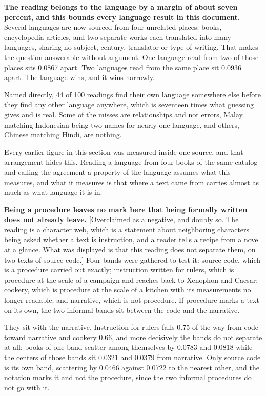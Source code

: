 \textbf{The reading belongs to the language by a margin of about seven percent, and this bounds every language result in this document.} Several languages are now sourced from four unrelated places: books, encyclopedia articles, and two separate works each translated into many languages, sharing no subject, century, translator or type of writing. That makes the question answerable without argument. One language read from two of those places sits 0.0867 apart. Two languages read from the same place sit 0.0936 apart. The language wins, and it wins narrowly.

Named directly, 44 of 100 readings find their own language somewhere else before they find any other language anywhere, which is seventeen times what guessing gives and is real. Some of the misses are relationships and not errors, Malay matching Indonesian being two names for nearly one language, and others, Chinese matching Hindi, are nothing.

Every earlier figure in this section was measured inside one source, and that arrangement hides this. Reading a language from four books of the same catalog and calling the agreement a property of the language assumes what this measures, and what it measures is that where a text came from carries almost as much as what language it is in.

\textbf{Being a procedure leaves no mark here that being formally written does not already leave.} [Overclaimed as a negative, and doubly so. The reading is a character web, which is a statement about neighboring characters being asked whether a text is instruction, and a reader tells a recipe from a novel at a glance. What was displayed is that this reading does not separate them, on two texts of source code.] Four bands were gathered to test it: source code, which is a procedure carried out exactly; instruction written for rulers, which is procedure at the scale of a campaign and reaches back to Xenophon and Caesar; cookery, which is procedure at the scale of a kitchen with its measurements no longer readable; and narrative, which is not procedure. If procedure marks a text on its own, the two informal bands sit between the code and the narrative.

They sit with the narrative. Instruction for rulers falls 0.75 of the way from code toward narrative and cookery 0.66, and more decisively the bands do not separate at all: books of one band scatter among themselves by 0.0783 and 0.0818 while the centers of those bands sit 0.0321 and 0.0379 from narrative. Only source code is its own band, scattering by 0.0466 against 0.0722 to the nearest other, and the notation marks it and not the procedure, since the two informal procedures do not go with it.

